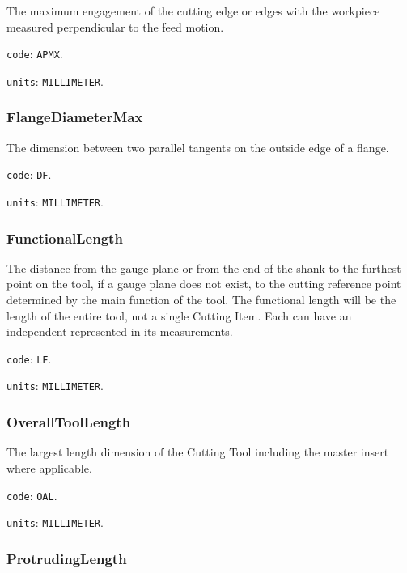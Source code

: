 The maximum engagement of the cutting edge or edges with the workpiece measured perpendicular to the feed motion.


\texttt{code}: \texttt{APMX}.


\texttt{units}: \texttt{MILLIMETER}.



\subsubsection{FlangeDiameterMax}
\label{sec:FlangeDiameterMax}



The dimension between two parallel tangents on the outside edge of a flange.


\texttt{code}: \texttt{DF}.


\texttt{units}: \texttt{MILLIMETER}.



\subsubsection{FunctionalLength}
\label{sec:FunctionalLength}



The distance from the gauge plane or from the end of the shank to the furthest point on the tool, if a gauge plane does not exist, to the cutting reference point determined by the main function of the tool. The  functional length will be the length of the entire tool, not a single Cutting Item. Each  can have an independent  represented in its measurements. 


\texttt{code}: \texttt{LF}.


\texttt{units}: \texttt{MILLIMETER}.



\subsubsection{OverallToolLength}
\label{sec:OverallToolLength}



The largest length dimension of the Cutting Tool including the master insert where applicable.


\texttt{code}: \texttt{OAL}.


\texttt{units}: \texttt{MILLIMETER}.



\subsubsection{ProtrudingLength}
\label{sec:ProtrudingLength}



